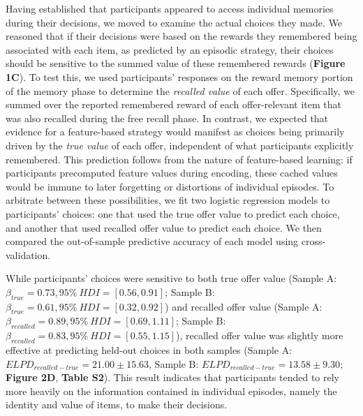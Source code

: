 \documentclass[10pt,letterpaper]{article}
\begin{document}
Having established that participants appeared to access individual memories during their decisions, we moved to examine the actual choices they made. We reasoned that if their decisions were based on the rewards they remembered being associated with each item, as predicted by an episodic strategy, their choices should be sensitive to the summed value of these remembered rewards (\textbf{Figure 1C}). To test this, we used participants' responses on the reward memory portion of the memory phase to determine the \textit{recalled value} of each offer. Specifically, we summed over the reported remembered reward of each offer-relevant item that was also recalled during the free recall phase. In contrast, we expected that evidence for a feature-based strategy would manifest as choices being primarily driven by the \textit{true value} of each offer, independent of what participants explicitly remembered. This prediction follows from the nature of feature-based learning: if participants precomputed feature values during encoding, these cached values would be immune to later forgetting or distortions of individual episodes. To arbitrate between these possibilities, we fit two logistic regression models to participants' choices: one that used the true offer value to predict each choice, and another that used recalled offer value to predict each choice. We then compared the out-of-sample predictive accuracy of each model using cross-validation.

While participants' choices were sensitive to both true offer value (Sample A: $\beta_{true} = 0.73, 95\% \ HDI = [0.56, 0.91]$; Sample B: $\beta_{true} = 0.61, 95\% \ HDI = [0.32, 0.92]$) and recalled offer value (Sample A: $\beta_{recalled} = 0.89, 95\% \ HDI = [0.69, 1.11]$; Sample B: $\beta_{recalled} = 0.83, 95\% \ HDI = [0.55, 1.15]$), recalled offer value was slightly more effective at predicting held-out choices in both samples (Sample A: $ELPD_{recalled-true} = 21.00 \pm 15.63$, Sample B: $ELPD_{recalled-true} = 13.58 \pm 9.30$; \textbf{Figure 2D}, \textbf{Table S2}). This result indicates that participants tended to rely more heavily on the information contained in individual episodes, namely the identity and value of items, to make their decisions.
\end{document}
